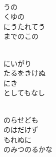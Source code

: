 \documentclass[10pt,b5j]{tarticle} %
\begin{document}
\begin{enumerate}
\begin{minipage}[c]{\blocksize}
    \end{minipage}
    \begin{minipage}[c]{\blocksize}
        
        \vspace{\linespace}
        \item~\\
        うの\\
        くゆの\\
        にうたれてう\\
        までのこの
        
    \end{minipage}
    \begin{minipage}[c]{\blocksize}
        
        \vspace{\linespace}
        \item~\\
        にいがり\\
        たるをきけぬ\\
        にき\\
        としてもなし
        
    \end{minipage}
    \begin{minipage}[c]{\blocksize}
        
        \vspace{\linespace}
        \item~\\
        のらせども\\
        のはだけず\\
        もれぬに\\
        のみつのるかな
        
    \end{minipage}
    \begin{minipage}[c]{\blocksize}
        

\end{minipage}
\end{enumerate}
\end{document}
